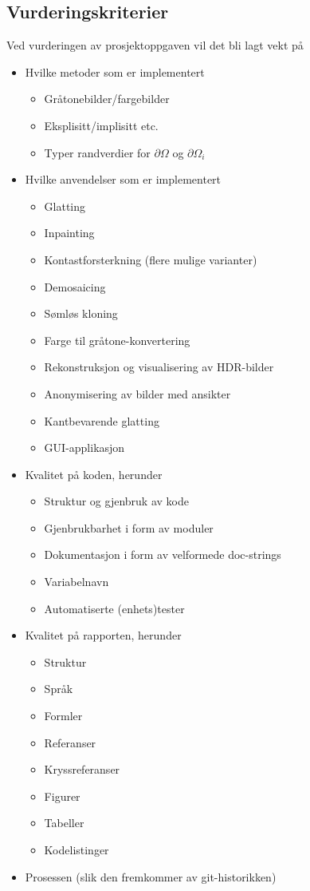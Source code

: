 \documentclass[11pt,a4paper]{article}
\begin{document}
\subsection{Vurderingskriterier}

Ved vurderingen av prosjektoppgaven vil det bli lagt vekt på
\begin{itemize}[noitemsep]
\item Hvilke metoder som er implementert
  \begin{itemize}[noitemsep]
  \item Gråtonebilder/fargebilder
  \item Eksplisitt/implisitt etc.
  \item Typer randverdier for $\partial\Omega$ og $\partial\Omega_i$
  \end{itemize}
\item Hvilke anvendelser som er implementert
  \begin{itemize}[noitemsep]
  \item Glatting
  \item Inpainting
  \item Kontastforsterkning (flere mulige varianter)
  \item Demosaicing
  \item Sømløs kloning
  \item Farge til gråtone-konvertering
  \item Rekonstruksjon og visualisering av HDR-bilder 
  \item Anonymisering av bilder med ansikter
  \item Kantbevarende glatting
  \item GUI-applikasjon
  \end{itemize}
\item Kvalitet på koden, herunder
  \begin{itemize}[noitemsep]
  \item Struktur og gjenbruk av kode
  \item Gjenbrukbarhet i form av moduler
  \item Dokumentasjon i form av velformede doc-strings
  \item Variabelnavn
  \item Automatiserte (enhets)tester
  \end{itemize}
\item Kvalitet på rapporten, herunder
  \begin{itemize}[noitemsep]
  \item Struktur
  \item Språk
  \item Formler
  \item Referanser
  \item Kryssreferanser
  \item Figurer
  \item Tabeller
  \item Kodelistinger
  \end{itemize}
\item Prosessen (slik den fremkommer av git-historikken)
\end{itemize}
\end{document}
